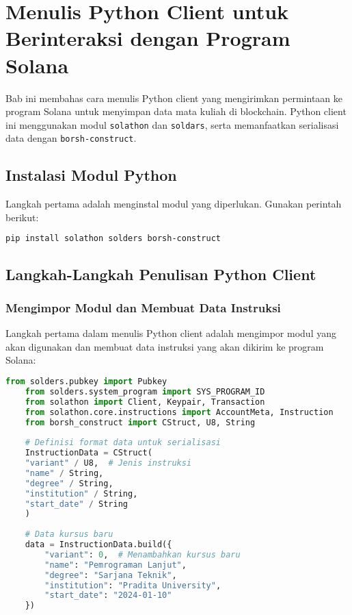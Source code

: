 \chapter{Menulis Python Client untuk Berinteraksi dengan Program Solana}

Bab ini membahas cara menulis Python client yang mengirimkan permintaan ke program Solana untuk menyimpan data mata kuliah di blockchain. Python client ini menggunakan modul \texttt{solathon} dan \texttt{soldars}, serta memanfaatkan serialisasi data dengan \texttt{borsh-construct}.

\section{Instalasi Modul Python}
Langkah pertama adalah menginstal modul yang diperlukan. Gunakan perintah berikut:

\begin{lstlisting}[language=bash]
	pip install solathon solders borsh-construct
\end{lstlisting}

\section{Langkah-Langkah Penulisan Python Client}

\subsection{Mengimpor Modul dan Membuat Data Instruksi}
Langkah pertama dalam menulis Python client adalah mengimpor modul yang akan digunakan dan membuat data instruksi yang akan dikirim ke program Solana:

\begin{lstlisting}[language=Python]
	from solders.pubkey import Pubkey
	from solders.system_program import SYS_PROGRAM_ID
	from solathon import Client, Keypair, Transaction
	from solathon.core.instructions import AccountMeta, Instruction
	from borsh_construct import CStruct, U8, String
	
	# Definisi format data untuk serialisasi
	InstructionData = CStruct(
	"variant" / U8,  # Jenis instruksi
	"name" / String,
	"degree" / String,
	"institution" / String,
	"start_date" / String
	)
	
	# Data kursus baru
	data = InstructionData.build({
		"variant": 0,  # Menambahkan kursus baru
		"name": "Pemrograman Lanjut",
		"degree": "Sarjana Teknik",
		"institution": "Pradita University",
		"start_date": "2024-01-10"
	})
\end{lstlisting}

